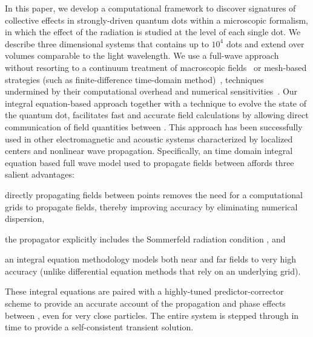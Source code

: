 In this paper, we develop a computational framework to discover signatures of collective effects in strongly-driven quantum dots within a microscopic formalism, in which the effect of the radiation is studied at the level of each single dot.
We describe three dimensional systems that contains up to $10^4$ dots and extend over volumes comparable to the light wavelength.
We use a full-wave approach without resorting to a continuum treatment of macroscopic fields~\cite{} or mesh-based strategies (such as finite-difference time-domain method)~\cite{Vanneste2001,Fratalocchi2008}, techniques undermined by their computational overhead and numerical sensitivities~\cite{Baczewski2013}.
Our integral equation-based approach together with a technique to evolve the  state of the  quantum dot, facilitates fast and accurate field calculations by allowing direct communication of field quantities between \qds{}.
This approach has been successfully used in other electromagnetic \cite{otherpapersfromshanker} and acoustic \cite{Glosser2016} systems characterized by localized centers and nonlinear wave propagation. Specifically, an time domain integral equation based full wave model used to propagate fields between \qds{} affords three salient advantages:
\begin{inparaenum}[(i)]
  \item directly propagating fields between points removes the need for a computational grids to propagate fields, thereby improving accuracy by eliminating numerical dispersion,
  \item the propagator explicitly includes the Sommerfeld radiation condition \cite{Stratton1948}, and
  \item an integral equation methodology models both near and far fields to very high accuracy (unlike differential equation methods that rely on an underlying grid).
\end{inparaenum}
These  integral equations are paired with a  highly-tuned predictor-corrector scheme to provide an accurate account of the propagation and phase effects between \qds{}, even for very close particles. The entire system is stepped through in time to provide a self-consistent transient solution. 

